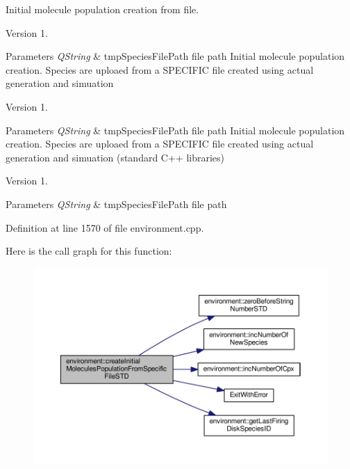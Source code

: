 Initial molecule population creation from file. 

\begin{DoxyVersion}{Version}
1. 
\end{DoxyVersion}

\begin{DoxyParams}{Parameters}
{\em Q\-String} & tmp\-Species\-File\-Path file path Initial molecule population creation. Species are uploaed from a S\-P\-E\-C\-I\-F\-I\-C file created using actual generation and simuation \\
\hline
\end{DoxyParams}
\begin{DoxyVersion}{Version}
1. 
\end{DoxyVersion}

\begin{DoxyParams}{Parameters}
{\em Q\-String} & tmp\-Species\-File\-Path file path Initial molecule population creation. Species are uploaed from a S\-P\-E\-C\-I\-F\-I\-C file created using actual generation and simuation (standard C++ libraries) \\
\hline
\end{DoxyParams}
\begin{DoxyVersion}{Version}
1. 
\end{DoxyVersion}

\begin{DoxyParams}{Parameters}
{\em Q\-String} & tmp\-Species\-File\-Path file path \\
\hline
\end{DoxyParams}


Definition at line 1570 of file environment.\-cpp.



Here is the call graph for this function\-:\nopagebreak
\begin{figure}[H]
\begin{center}
\leavevmode
\includegraphics[width=350pt]{a00003_ab85fdf18a88fb51afc48eba31d0ed1b2_cgraph}
\end{center}
\end{figure}


